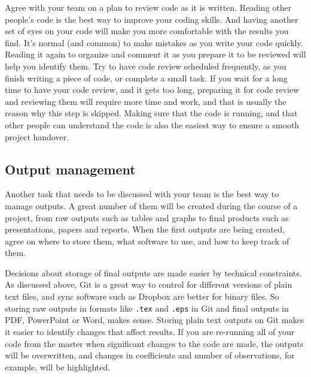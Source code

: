 Agree with your team on a plan to review code as it is written.
Reading other people's code is the best way to improve your coding skills.
And having another set of eyes on your code will make you more comfortable with the results you find.
It's normal (and common) to make mistakes as you write your code quickly.
Reading it again to organize and comment it as you prepare it to be reviewed will help you identify them.
Try to have code review scheduled frequently, as you finish writing a piece of code, or complete a small task.
If you wait for a long time to have your code review, and it gets too long,
preparing it for code review and reviewing them will require more time and work,
and that is usually the reason why this step is skipped.
Making sure that the code is running,
and that other people can understand the code is also the easiest way to ensure a smooth project handover.

\subsection{Output management}

Another task that needs to be discussed with your team is the best way to manage outputs.
A great number of them will be created during the course of a project,
from raw outputs such as tables and graphs to final products such as presentations, papers and reports.
When the first outputs are being created, agree on where to store them,
what software to use, and how to keep track of them.

Decisions about storage of final outputs are made easier by technical constraints.
As discussed above, Git is a great way to control for different versions of
plain text files, and sync software such as Dropbox are better for binary files.
So storing raw outputs in formats like \texttt{.tex} and \texttt{.eps} in Git and
final outputs in PDF, PowerPoint or Word, makes sense.
Storing plain text outputs on Git makes it easier to identify changes that affect results.
If you are re-running all of your code from the master when significant changes to the code are made,
the outputs will be overwritten, and changes in coefficients and number of observations, for example,
will be highlighted.

